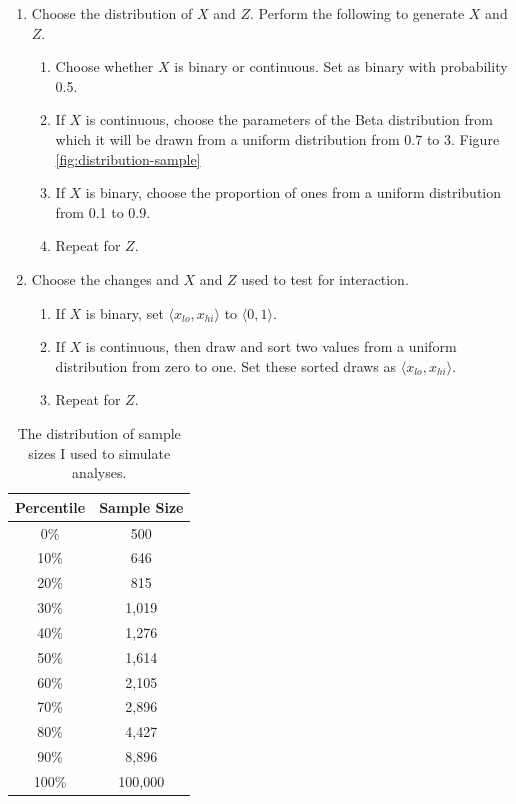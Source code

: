 \documentclass[12pt]{article}
\begin{document}
\begin{appendix}
\begin{enumerate}
        \item Choose the distribution of $X$ and $Z$. Perform the following to generate $X$ and $Z$.
                \begin{enumerate}
                \item Choose whether $X$ is binary or continuous. Set as binary with probability 0.5.
                \item If $X$ is continuous, choose the parameters of the Beta distribution from which it will be drawn from a uniform distribution from 0.7 to 3. Figure \ref{fig:distribution-sample}
                \item If $X$ is binary, choose the proportion of ones from a uniform distribution from 0.1 to 0.9.
                \item Repeat for $Z$.
                \end{enumerate}
                
        \item Choose the changes and $X$ and $Z$ used to test for interaction.
                \begin{enumerate}
                \item If $X$ is binary, set $\langle x_{lo}, x_{hi} \rangle$ to $\langle 0, 1 \rangle$.
                \item If $X$ is continuous, then draw and sort two values from a uniform distribution from zero to one. Set these sorted draws as $\langle x_{lo}, x_{hi} \rangle$.
                \item Repeat for $Z$.
                \end{enumerate}
\end{enumerate}


\begin{table}[h]
\begin{center}
\begin{tabular}{|cc|}
\hline
Percentile & Sample Size \\ 
\hline
0\% & 500 \\ 
10\% & 646 \\ 
20\% & 815 \\ 
30\% & 1,019 \\ 
40\% & 1,276 \\ 
50\% & 1,614 \\ 
60\% & 2,105 \\ 
70\% & 2,896 \\ 
80\% & 4,427 \\ 
90\% & 8,896 \\ 
100\% & 100,000 \\ 
\hline
\end{tabular}\caption{The distribution of sample sizes I used to simulate analyses.}\label{tab:n}
\end{center}
\end{table}     


\end{appendix}
\end{document}
